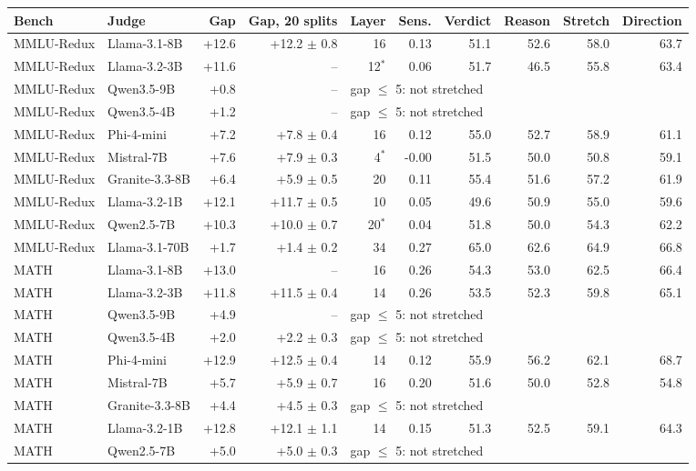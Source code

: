 \begin{tabular}{ll rr rr rrrr}
\toprule
Bench & Judge & Gap & Gap, 20 splits & Layer & Sens. & Verdict & Reason & Stretch & Direction \\
\midrule
MMLU-Redux & Llama-3.1-8B & +12.6 & +12.2 $\pm$ 0.8 & 16 & 0.13 & 51.1 & 52.6 & 58.0 & 63.7 \\
MMLU-Redux & Llama-3.2-3B & +11.6 & -- & 12$^*$ & 0.06 & 51.7 & 46.5 & 55.8 & 63.4 \\
MMLU-Redux & Qwen3.5-9B & +0.8 & -- & \multicolumn{6}{l}{gap $\le$ 5: not stretched} \\
MMLU-Redux & Qwen3.5-4B & +1.2 & -- & \multicolumn{6}{l}{gap $\le$ 5: not stretched} \\
MMLU-Redux & Phi-4-mini & +7.2 & +7.8 $\pm$ 0.4 & 16 & 0.12 & 55.0 & 52.7 & 58.9 & 61.1 \\
MMLU-Redux & Mistral-7B & +7.6 & +7.9 $\pm$ 0.3 & 4$^*$ & -0.00 & 51.5 & 50.0 & 50.8 & 59.1 \\
MMLU-Redux & Granite-3.3-8B & +6.4 & +5.9 $\pm$ 0.5 & 20 & 0.11 & 55.4 & 51.6 & 57.2 & 61.9 \\
MMLU-Redux & Llama-3.2-1B & +12.1 & +11.7 $\pm$ 0.5 & 10 & 0.05 & 49.6 & 50.9 & 55.0 & 59.6 \\
MMLU-Redux & Qwen2.5-7B & +10.3 & +10.0 $\pm$ 0.7 & 20$^*$ & 0.04 & 51.8 & 50.0 & 54.3 & 62.2 \\
MMLU-Redux & Llama-3.1-70B & +1.7 & +1.4 $\pm$ 0.2 & 34 & 0.27 & 65.0 & 62.6 & 64.9 & 66.8 \\
\midrule
MATH & Llama-3.1-8B & +13.0 & -- & 16 & 0.26 & 54.3 & 53.0 & 62.5 & 66.4 \\
MATH & Llama-3.2-3B & +11.8 & +11.5 $\pm$ 0.4 & 14 & 0.26 & 53.5 & 52.3 & 59.8 & 65.1 \\
MATH & Qwen3.5-9B & +4.9 & -- & \multicolumn{6}{l}{gap $\le$ 5: not stretched} \\
MATH & Qwen3.5-4B & +2.0 & +2.2 $\pm$ 0.3 & \multicolumn{6}{l}{gap $\le$ 5: not stretched} \\
MATH & Phi-4-mini & +12.9 & +12.5 $\pm$ 0.4 & 14 & 0.12 & 55.9 & 56.2 & 62.1 & 68.7 \\
MATH & Mistral-7B & +5.7 & +5.9 $\pm$ 0.7 & 16 & 0.20 & 51.6 & 50.0 & 52.8 & 54.8 \\
MATH & Granite-3.3-8B & +4.4 & +4.5 $\pm$ 0.3 & \multicolumn{6}{l}{gap $\le$ 5: not stretched} \\
MATH & Llama-3.2-1B & +12.8 & +12.1 $\pm$ 1.1 & 14 & 0.15 & 51.3 & 52.5 & 59.1 & 64.3 \\
MATH & Qwen2.5-7B & +5.0 & +5.0 $\pm$ 0.3 & \multicolumn{6}{l}{gap $\le$ 5: not stretched} \\

\end{tabular}
